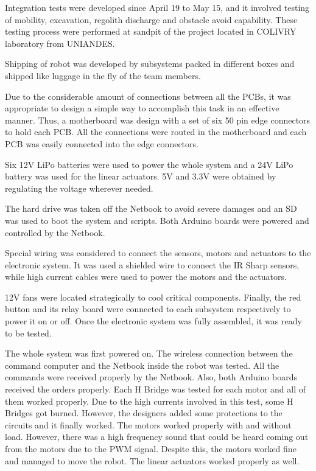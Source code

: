 \documentclass[conference]{IEEEtran}
\begin{document}
Integration tests were developed since April 19 to May 15, and it involved testing of mobility, excavation, regolith discharge and obstacle avoid capability. These testing process were performed at sandpit of the project located in COLIVRY laboratory from UNIANDES.

Shipping of robot was developed by subsystems packed in different boxes and shipped like luggage in the fly of the team members.

Due to the considerable amount of connections between all the PCBs, it was appropriate to design a simple way to accomplish this task in an effective manner. Thus, a motherboard was design with a set of six 50 pin edge connectors to hold each PCB. All the connections were routed in the motherboard and each PCB was easily connected into the edge connectors. 

Six 12V LiPo batteries were used to power the whole system and a 24V LiPo battery was used for the linear actuators. 5V and 3.3V were obtained by regulating the voltage wherever needed. 

The hard drive was taken off the Netbook to avoid severe damages and an SD was used to boot the system and scripts. Both Arduino boards were powered and controlled by the Netbook.

Special wiring was considered to connect the sensors, motors and actuators to the electronic system. It was used a shielded wire to connect the IR Sharp sensors, while high current cables were used to power the motors and the actuators.

12V fans were located strategically to cool critical components. Finally, the red button and its relay board were connected to each subsystem respectively to power it on or off. Once the electronic system was fully assembled, it was ready to be tested.

The whole system was first powered on. The wireless connection between the command computer and the Netbook inside the robot was tested. All the commands were received properly by the Netbook. Also, both Arduino boards received the orders properly. Each H Bridge was tested for each motor and all of them worked properly. Due to the high currents involved in this test, some H Bridges got burned. However, the designers added some protections to the circuits and it finally worked. The motors worked properly with and without load. However, there was a high frequency sound that could be heard coming out from the motors due to the PWM signal. Despite this, the motors worked fine and managed to move the robot. The linear actuators worked properly as well.
\end{document}
